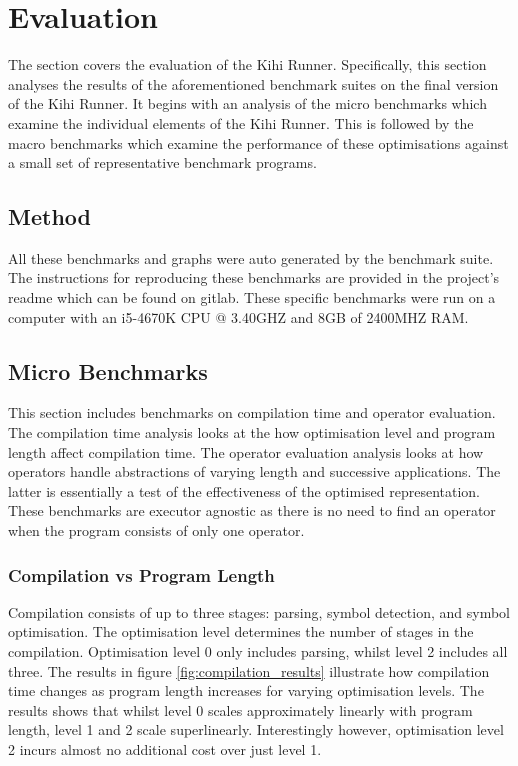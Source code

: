 \chapter{Evaluation} \label{C:evaluation}
The section covers the evaluation of the Kihi Runner. Specifically, this section analyses the results of the aforementioned benchmark suites on the final version of the Kihi Runner. It begins with an analysis of the micro benchmarks which examine the individual elements of the Kihi Runner. This is followed by the macro benchmarks which examine the performance of these optimisations against a small set of representative benchmark programs.

\section{Method}
All these benchmarks and graphs were auto generated by the benchmark suite. The instructions for reproducing these benchmarks are provided in the project's readme which can be found on gitlab. These specific benchmarks were run on a computer with an i5-4670K CPU @ 3.40GHZ and 8GB of 2400MHZ RAM.

\section{Micro Benchmarks}
This section includes benchmarks on compilation time and operator evaluation. The compilation time analysis looks at the how optimisation level and program length affect compilation time. The operator evaluation analysis looks at how operators handle abstractions of varying length and successive applications. The latter is essentially a test of the effectiveness of the optimised representation. These benchmarks are executor agnostic as there is no need to find an operator when the program consists of only one operator.

\subsection{Compilation vs Program Length}

Compilation consists of up to three stages: parsing, symbol detection, and symbol optimisation. The optimisation level determines the number of stages in the compilation. Optimisation level 0 only includes parsing, whilst level 2 includes all three. The results in figure \ref{fig:compilation_results} illustrate how compilation time changes as program length increases for varying optimisation levels. The results shows that whilst level 0 scales approximately linearly with program length, level 1 and 2 scale superlinearly. Interestingly however, optimisation level 2 incurs almost no additional cost over just level 1.

